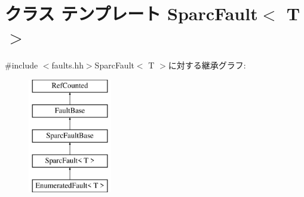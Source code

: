 \hypertarget{classSparcISA_1_1SparcFault}{
\section{クラス テンプレート SparcFault$<$ T $>$}
\label{classSparcISA_1_1SparcFault}
}


{\ttfamily \#include $<$faults.hh$>$}SparcFault$<$ T $>$に対する継承グラフ:\begin{figure}[H]
\begin{center}
\leavevmode
\includegraphics[height=5cm]{classSparcISA_1_1SparcFault}
\end{center}
\end{figure}
